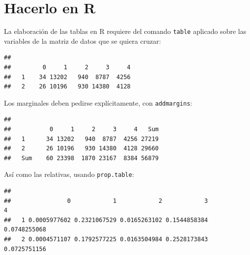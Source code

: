\documentclass[]{book}
\newenvironment{Shaded}{\begin{snugshade}}{\end{snugshade}}
\newcommand{\FloatTok}[1]{\textcolor[rgb]{0.00,0.00,0.81}{#1}}
\newcommand{\KeywordTok}[1]{\textcolor[rgb]{0.13,0.29,0.53}{\textbf{#1}}}
\newcommand{\NormalTok}[1]{#1}
\newcommand{\OperatorTok}[1]{\textcolor[rgb]{0.81,0.36,0.00}{\textbf{#1}}}
\begin{document}
\hypertarget{hacerlo-en-r-2}{%
\section{Hacerlo en R}\label{hacerlo-en-r-2}}

La elaboración de las tablas en R requiere del comando \texttt{table} aplicado sobre las variables de la matriz de datos que se quiera cruzar:

\begin{Shaded}
\end{Shaded}

\begin{verbatim}
##    
##         0     1     2     3     4
##   1    34 13202   940  8787  4256
##   2    26 10196   930 14380  4128
\end{verbatim}

Los marginales deben pedirse explícitamente, con \texttt{addmargins}:

\begin{Shaded}
\end{Shaded}

\begin{verbatim}
##      
##           0     1     2     3     4   Sum
##   1      34 13202   940  8787  4256 27219
##   2      26 10196   930 14380  4128 29660
##   Sum    60 23398  1870 23167  8384 56879
\end{verbatim}

Así como las relativas, usando \texttt{prop.table}:

\begin{Shaded}
\end{Shaded}

\begin{verbatim}
##    
##                0            1            2            3            4
##   1 0.0005977602 0.2321067529 0.0165263102 0.1544858384 0.0748255068
##   2 0.0004571107 0.1792577225 0.0163504984 0.2528173843 0.0725751156
\end{verbatim}
\end{document}
